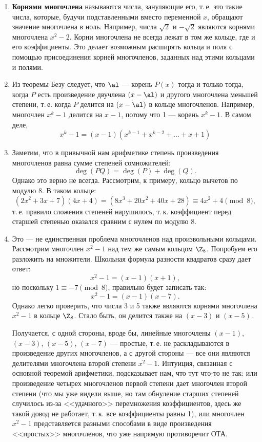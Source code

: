 \begin{enumerate}
\item \textbf{Корнями многочлена} называются числа, зануляющие его, т.\,е. это такие числа, которые, будучи подставленными вместо переменной $x$, обращают значение многочлена в ноль. Например, числа $\sqrt 2$ и $-\sqrt 2$ являются корнями многочлена $x^2-2$. Корни многочлена не всегда лежат в том же кольце, где и его коэффициенты. Это делает возможным расширять кольца и поля с помощью присоединения корней многочленов, заданных над этими кольцами и полями.
\item Из теоремы Безу следует, что $\al$ --- корень $P(x)$ тогда и только тогда, когда $P$ есть произведение двучлена $(x-\al)$ и другого многочлена меньшей степени, т.\,е. когда $P$ делится на $(x-\al)$ в кольце многочленов. Например, многочлен $x^k-1$ делится на $x-1$, потому что 1 --- корень $x^k-1$. В самом деле,
$$
x^k-1=(x-1)(x^{k-1}+x^{k-2}+\dots+x+1)
$$

\item Заметим, что в привычной нам арифметике степень произведения многочленов равна сумме степеней сомножителей:
$$
\deg(PQ)=\deg(P)+\deg(Q).
$$
Однако это верно не всегда. Рассмотрим, к примеру, кольцо вычетов по модулю $8$. В таком кольце:
$$
(2x^2+3x+7)(4x+4) = (8x^3+20x^2+40x+28) \equiv 4x^2+4\pmod 8,
$$
т.\,е. правило сложения степеней нарушилось, т.\,к. коэффициент перед старшей степенью оказался сравним с нулем по модулю $8$.
\item Это --- не единственная проблема многочленов над произвольными кольцами. Рассмотрим многочлен $x^2-1$ над тем же самым кольцом $\Z_8$.
Попробуем его разложить на множители. Школьная формула разности квадратов сразу дает ответ:
$$
x^2-1=(x-1)(x+1),
$$
но поскольку $1\equiv -7\pmod 8$, правильно будет записать так:
$$
x^2-1=(x-1)(x-7).
$$
Однако легко проверить, что числа 3 и 5 также являются корнями многочлена $x^2-1$ в кольце $\Z_8$. Стало быть, он делится также на $(x-3)$ и $(x-5)$.

Получается, с одной стороны, вроде бы, линейные многочлены $(x-1)$, $(x-3)$, $(x-5)$, $(x-7)$ --- простые, т.\,е. не раскладываются в произведение других многочленов, а с другой стороны --- все они являются делителями многочлена второй степени $x^2-1$. Интуиция, связанная с основной теоремой арифметики, подсказывает нам, что тут что-то не так: или произведение четырех многочленов первой степени дает многочлен второй степени (что мы уже видели выше, но там обнуление старших степеней случилось из-за <<удачного>> перемножения коэффициентов, здесь же такой довод не работает, т.\,к. все коэффициенты равны 1), или многочлен $x^2-1$ представляется разными способами в виде произведения <<простых>> многочленов, что уже напрямую противоречит ОТА.


\end{enumerate}

